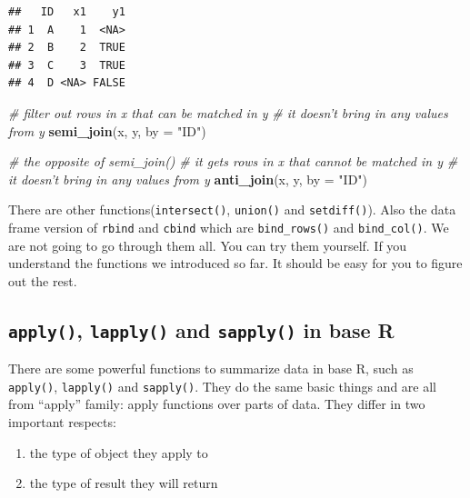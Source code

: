 \documentclass[12pt,]{krantz}
\makeatletter
\newenvironment{Shaded}{\begin{snugshade}}{\end{snugshade}}
\newcommand{\CommentTok}[1]{\textcolor[rgb]{0.37,0.37,0.37}{\textit{#1}}}
\newcommand{\DataTypeTok}[1]{\textcolor[rgb]{0.27,0.27,0.27}{#1}}
\newcommand{\KeywordTok}[1]{\textcolor[rgb]{0.27,0.27,0.27}{\textbf{#1}}}
\newcommand{\NormalTok}[1]{#1}
\newcommand{\StringTok}[1]{\textcolor[rgb]{0.5,0.5,0.5}{#1}}
\providecommand{\tightlist}{%
  \setlength{\itemsep}{0pt}\setlength{\parskip}{0pt}}
\newenvironment{kframe}{%
\medskip{}
\setlength{\fboxsep}{.8em}
 \def\at@end@of@kframe{}%
 \ifinner\ifhmode%
  \def\at@end@of@kframe{\end{minipage}}%
  \begin{minipage}{\columnwidth}%
 \fi\fi%
 \def\FrameCommand##1{\hskip\@totalleftmargin \hskip-\fboxsep
 \colorbox{shadecolor}{##1}\hskip-\fboxsep
     \hskip-\linewidth \hskip-\@totalleftmargin \hskip\columnwidth}%
 \MakeFramed {\advance\hsize-\width
   \@totalleftmargin\z@ \linewidth\hsize
   \@setminipage}}%
 {\par\unskip\endMakeFramed%
 \at@end@of@kframe}
\renewenvironment{Shaded}{\begin{kframe}}{\end{kframe}}
\makeatother
\begin{document}
\begin{verbatim}
##   ID   x1    y1
## 1  A    1  <NA>
## 2  B    2  TRUE
## 3  C    3  TRUE
## 4  D <NA> FALSE
\end{verbatim}

\begin{Shaded}
\begin{Highlighting}[]
\CommentTok{# filter out rows in x that can be matched in y }
\CommentTok{# it doesn't bring in any values from y }
\KeywordTok{semi_join}\NormalTok{(x, y, }\DataTypeTok{by =} \StringTok{"ID"}\NormalTok{)}
\end{Highlighting}
\end{Shaded}

\begin{Shaded}
\begin{Highlighting}[]
\CommentTok{# the opposite of  semi_join()}
\CommentTok{# it gets rows in x that cannot be matched in y}
\CommentTok{# it doesn't bring in any values from y}
\KeywordTok{anti_join}\NormalTok{(x, y, }\DataTypeTok{by =} \StringTok{"ID"}\NormalTok{)}
\end{Highlighting}
\end{Shaded}

There are other functions(\texttt{intersect()}, \texttt{union()} and \texttt{setdiff()}). Also the data frame version of \texttt{rbind} and \texttt{cbind} which are \texttt{bind\_rows()} and \texttt{bind\_col()}. We are not going to go through them all. You can try them yourself. If you understand the functions we introduced so far. It should be easy for you to figure out the rest.

\hypertarget{applyfamilyinbaser}{%
\subsection{\texorpdfstring{\texttt{apply()}, \texttt{lapply()} and \texttt{sapply()} in base R}{apply(), lapply() and sapply() in base R}}\label{applyfamilyinbaser}}

There are some powerful functions to summarize data in base R, such as \texttt{apply()}, \texttt{lapply()} and \texttt{sapply()}. They do the same basic things and are all from ``apply'' family: apply functions over parts of data. They differ in two important respects:

\begin{enumerate}
\def\labelenumi{\arabic{enumi}.}
\tightlist
\item
  the type of object they apply to
\item
  the type of result they will return
\end{enumerate}
\end{document}
